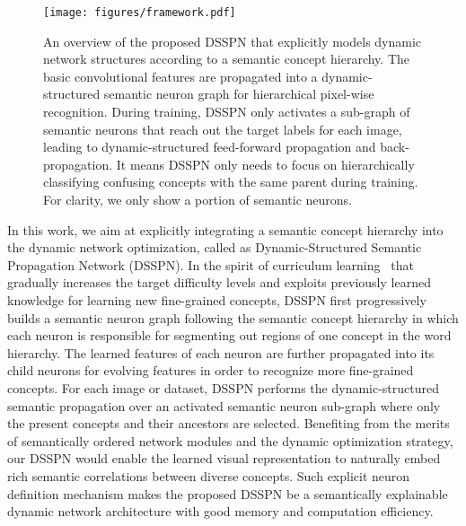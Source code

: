 \documentclass[10pt,twocolumn,letterpaper]{article}
\begin{document}
\begin{figure*}[!tp]
		\begin{center}
			\texttt{[image: figures/framework.pdf]}
			\caption{An overview of the proposed DSSPN that explicitly models dynamic network structures according to a semantic concept hierarchy. The basic convolutional features are propagated into a dynamic-structured semantic neuron graph for hierarchical pixel-wise recognition. During training, DSSPN only activates a sub-graph of semantic neurons that reach out the target labels for each image, leading to dynamic-structured feed-forward propagation and back-propagation. It means DSSPN only needs to focus on hierarchically classifying confusing concepts with the same parent during training. For clarity, we only show a portion of semantic neurons.}
			\label{fig:framework}
		\end{center}
		\vspace{-4mm}
	\end{figure*}
	
 In this work, we aim at explicitly integrating a semantic concept hierarchy into the dynamic network optimization, called as Dynamic-Structured Semantic Propagation Network (DSSPN). In the spirit of curriculum learning~\cite{bengio2009curriculum} that gradually increases the target difficulty levels and exploits previously learned knowledge for learning new fine-grained concepts, DSSPN first progressively builds a semantic neuron graph following the semantic concept hierarchy in which each neuron is responsible for segmenting out regions of one concept in the word hierarchy. The learned features of each neuron are further propagated into its child neurons for evolving features in order to recognize more fine-grained concepts. For each image or dataset, DSSPN performs the dynamic-structured semantic propagation over an activated semantic neuron sub-graph where only the present concepts and their ancestors are selected. Benefiting from the merits of semantically ordered network modules and the dynamic optimization strategy, our DSSPN would enable the learned visual representation to naturally embed rich semantic correlations between diverse concepts. Such explicit neuron definition mechanism makes the proposed DSSPN be a semantically explainable dynamic network architecture with good memory and computation efficiency. 
 
\end{document}
